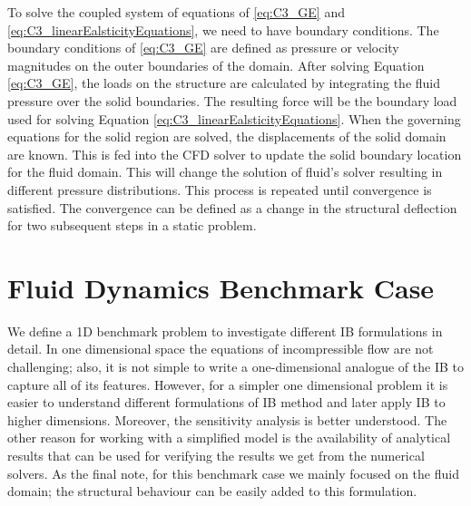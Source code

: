 To solve the coupled system of equations of \eqref{eq:C3_GE} and \eqref{eq:C3_linearEalsticityEquations}, we need to have boundary conditions. The boundary conditions of \eqref{eq:C3_GE} are defined as pressure or velocity magnitudes on the outer boundaries of the domain. After solving Equation \eqref{eq:C3_GE}, the loads on the structure are calculated by integrating the fluid pressure over the solid boundaries. The resulting force will be the boundary load used for solving Equation \eqref{eq:C3_linearEalsticityEquations}. When the governing equations for the solid region are solved, the displacements of the solid domain are known. This is fed into the CFD solver to update the solid boundary location for the fluid domain. This will change the solution of fluid's solver resulting in different pressure distributions. This process is repeated until convergence is satisfied. The convergence can be defined as a change in the structural deflection for two subsequent steps in a static problem.
\section{Fluid Dynamics Benchmark Case}\label{sec:C3_benchmark_case}
We define a 1D benchmark problem to investigate different IB formulations in detail. In one dimensional space the equations of incompressible flow are not challenging; also, it is not simple to write a one-dimensional analogue of the IB to capture all of its features. However, for a simpler one dimensional problem it is easier to understand different formulations of IB method and later apply IB to higher dimensions. Moreover, the sensitivity analysis is better understood. The other reason for working with a simplified model is the availability of analytical results that can be used for verifying the results we get from the numerical solvers. As the final note, for this benchmark case we mainly focused on the fluid domain; the structural behaviour can be easily added to this formulation.

